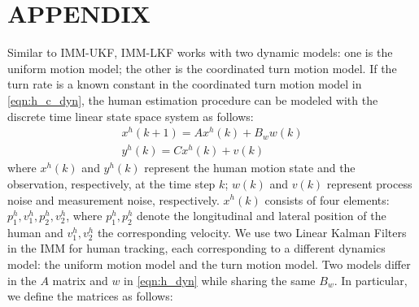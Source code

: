 \documentclass[letterpaper, 10 pt, conference]{ieeeconf}
\begin{document}






\section{APPENDIX}
 
Similar to IMM-UKF, IMM-LKF works with two dynamic models: one is the uniform motion model; the other is the coordinated turn motion model. If the turn rate is a known constant in the coordinated turn motion model in \cref{eqn:h_c_dyn}, the human estimation procedure can be modeled with the discrete time linear state space system as follows:
\begin{subequations}
\begin{align}
x^h(k+1) = Ax^h(k)+B_ww(k)\label{eqn:h_dyn}\\
y^h(k)=Cx^h(k)+v(k)\label{eqn:observation}
\end{align}
\end{subequations}
where $x^h(k)$ and $y^h(k)$ represent the human motion state and the observation, respectively, at the time step $k$; $w(k)$ and $v(k)$ represent process noise and measurement noise, respectively.
$x^h(k)$ consists of four elements: $p^h_1,v^h_1,p^h_2,v^h_2$, where $p^h_1,p^h_2$ denote the longitudinal and lateral position of the human and $v^h_1,v^h_2$ the corresponding velocity.
We use two Linear Kalman Filters in the IMM for human tracking, each corresponding to a different dynamics model: the uniform motion model and the turn motion model.
Two models differ in the $A$ matrix and $w$ in \cref{eqn:h_dyn} while sharing the same $B_w$.
In particular, we define the matrices as follows:
\end{document}
